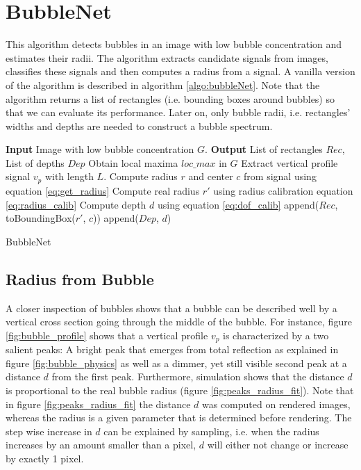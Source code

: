 		
		
		
	\section{BubbleNet}\label{BubbleNet}
	
	This algorithm detects bubbles in an image with low bubble concentration and estimates their radii. The algorithm extracts candidate signals from images, classifies these signals and then computes a radius from a signal. A vanilla version of the algorithm is described in algorithm \ref{algo:bubbleNet}. Note that the algorithm returns a list of rectangles (i.e. bounding boxes around bubbles) so that we can evaluate its performance. Later on, only bubble radii, i.e. rectangles' widths and depths are needed to construct a bubble spectrum. 
	
			\begin{algorithm}
			\begin{algorithmic}[1]
				\State \textbf{Input} Image with low bubble concentration $G$. 
				\State \textbf{Output} List of rectangles $Rec$, List of depths $Dep$
				\State Obtain local maxima $loc\_max$ in $G$
					\State Extract vertical profile signal $v_p$ with length $L$.
						\State Compute radius $r$ and center $c$ from signal using equation \ref{eq:get_radius}
						\State Compute real radius $r'$ using radius calibration equation \ref{eq:radius_calib}
						\State Compute depth $d$ using equation \ref{eq:dof_calib}
						\State append($Rec$, toBoundingBox($r'$, $c$))
						\State append($Dep$, $d$)
					\EndIf
				\EndFor
			\end{algorithmic}
			
			\caption{BubbleNet}
			\label{algo:bubbleNet}
		\end{algorithm}
	
	\subsection{Radius from Bubble}
	
	A closer inspection of bubbles shows that a bubble can be described well by a vertical cross section going through the middle of the bubble. For instance, figure \ref{fig:bubble_profile} shows that a vertical profile $v_p$ is characterized by a two salient peaks: A bright peak that emerges from total reflection as explained in figure \ref{fig:bubble_physics} as well as a dimmer, yet still visible second peak at a distance $d$ from the first peak. Furthermore, simulation shows that the distance $d$ is proportional to the real bubble radius (figure \ref{fig:peaks_radius_fit}). Note that in figure \ref{fig:peaks_radius_fit} the distance $d$ was computed on rendered images, whereas the radius is a given parameter that is determined before rendering. The step wise increase in $d$ can be explained by sampling, i.e. when the radius increases by an amount smaller than a pixel, $d$ will either not change or increase by exactly 1 pixel.
	
